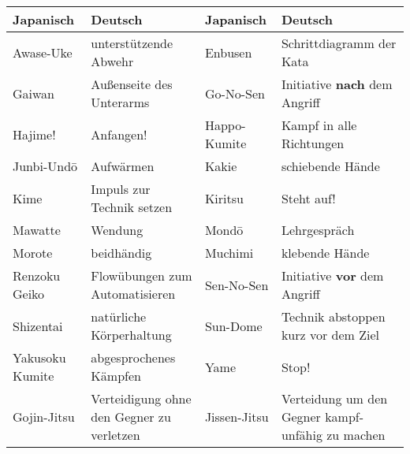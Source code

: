 	\begin{tabularx}{\linewidth}{lXlX}
	Japanisch	& Deutsch	& Japanisch&Deutsch\\
	\midrule
	Awase-Uke&	unterstützende Abwehr	&	Enbusen	&	Schrittdiagramm der Kata\\
	Gaiwan	& Außenseite des Unterarms	&	Go-No-Sen	&	Initiative \textbf{nach} dem Angriff\\
	Hajime!&	Anfangen!	&	Happo-Kumite	& Kampf in alle Richtungen\\
	Junbi-Und\={o}	& Aufwärmen	&	Kakie	& schiebende Hände\\
	Kime	&	Impuls zur Technik setzen	& Kiritsu & Steht auf!\\
	Mawatte	& Wendung&	Mond\={o}& Lehrgespräch\\
	Morote	& beidhändig	& Muchimi & klebende Hände\\
	Renzoku Geiko	& Flowübungen zum Automatisieren & Sen-No-Sen & Initiative \textbf{vor} dem Angriff\\
	Shizentai	& natürliche Körperhaltung&Sun-Dome & Technik abstoppen  kurz vor dem Ziel\\
	Yakusoku Kumite & abgesprochenes Kämpfen & Yame	& Stop!\\
	Gojin-Jitsu&Verteidigung ohne den Gegner zu verletzen&Jissen-Jitsu&Verteidung um den Gegner kampf- unfähig zu machen \\
	\end{tabularx}